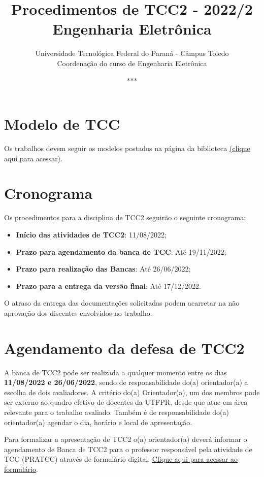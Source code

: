 \documentclass[a4paper, 12pt]{article}
\title{Procedimentos de TCC2 - 2022/2\\\textbf{Engenharia Eletrônica}}
\date{***}
\author{Universidade Tecnológica Federal do Paraná - Câmpus Toledo\\Coordenação do curso de Engenharia Eletrônica}
\newcommand{\startdate}{11/08/2022}		%
\newcommand{\agendadate}{19/11/2022}	%
\newcommand{\bancadate}{26/06/2022}		%
\newcommand{\finaldate}{17/12/2022}		%
\begin{document}
    \maketitle
    
    \section{Modelo de TCC}
    Os trabalhos devem seguir os modelos postados na página da biblioteca \href{http://portal.utfpr.edu.br/biblioteca/trabalhos-academicos}{(clique aqui para acessar)}.
    
    \section{Cronograma}
    \label{sec:CRO}
    
    Os procedimentos para a disciplina de TCC2 seguirão o seguinte cronograma:
    \begin{itemize}
    	\item \textbf{Início das atividades de TCC2}: \startdate;
    	\item \textbf{Prazo para agendamento da banca de TCC}: Até \agendadate;
    	\item \textbf{Prazo para realização das Bancas}: Até \bancadate;
    	\item \textbf{Prazo para a entrega da versão final}: Até \finaldate.
    \end{itemize}

	O atraso da entrega das documentações solicitadas podem acarretar na não aprovação dos discentes envolvidos no trabalho.    
        
   \section{Agendamento da defesa de TCC2}

    A banca de TCC2 pode ser realizada a qualquer momento entre os dias \textbf{\startdate{} e \bancadate{}}, sendo de responsabilidade do(a) orientador(a) a escolha de dois avaliadores. A critério do(a) Orientador(a), um dos membros pode ser externo ao quadro efetivo de docentes da UTFPR, desde que atue em área relevante para o trabalho avaliado. Também é de responsabilidade do(a) orientador(a) agendar o dia, horário e local de apresentação. 
    
    Para formalizar a apresentação de TCC2 o(a) orientador(a) deverá informar o agendamento de Banca de TCC2 para o professor responsável pela atividade de TCC (PRATCC) através de formulário digital: \href{https://forms.gle/QVNraTXAZ27V1xSK8}{Clique aqui para acessar ao formulário}.
    
\end{document}
